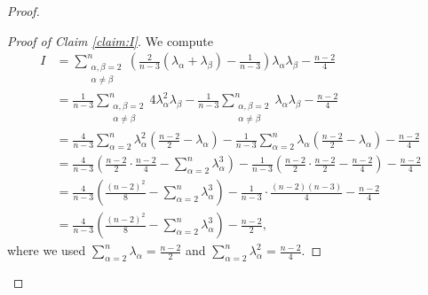 \documentclass[a4, 12pt]{amsart}
\theoremstyle{plain}
\begin{document}
\begin{proof}
	\begin{proof}[Proof of Claim \ref{claim:I}]
		We compute
	\begin{equation*}
	\begin{aligned}
			I &= \sum_{\substack{\alpha,\beta=2 \\ \alpha\neq\beta}}^n \left(\frac{2}{n-3}(\lambda_{\alpha} + \lambda_{\beta}) - \frac{1}{n-3}\right)\lambda_{\alpha}\lambda_{\beta} - \frac{n-2}{4} \\
			&= \frac{1}{n-3}\sum_{\substack{\alpha,\beta=2 \\ \alpha\neq\beta}}^n 4\lambda_\alpha^2 \lambda_\beta - \frac{1}{n-3}\sum_{\substack{\alpha,\beta=2 \\ \alpha\neq\beta}}^n \lambda_\alpha\lambda_\beta - \frac{n-2}{4} \\
			&= \frac{4}{n-3}\sum_{\alpha=2}^n \lambda_\alpha^2\left(\frac{n-2}{2} - \lambda_\alpha\right) - \frac{1}{n-3}\sum_{\alpha=2}^n\lambda_\alpha\left(\frac{n-2}{2} - \lambda_\alpha\right) - \frac{n-2}{4} \\
			&= \frac{4}{n-3}\left(\frac{n-2}{2} \cdot \frac{n-2}{4} - \sum_{\alpha=2}^n \lambda_\alpha^3\right) - \frac{1}{n-3}\left(\frac{n-2}{2} \cdot \frac{n-2}{2} - \frac{n-2}{4}\right) - \frac{n-2}{4} \\
			&= \frac{4}{n-3}\left(\frac{(n-2)^2}{8} - \sum_{\alpha=2}^n \lambda_\alpha^3\right) - \frac{1}{n-3} \cdot \frac{(n-2)(n-3)}{4} - \frac{n-2}{4} \\
			&= \frac{4}{n-3}\left(\frac{(n-2)^2}{8} - \sum_{\alpha=2}^n \lambda_\alpha^3\right) - \frac{n-2}{2},
		\end{aligned}
		\end{equation*}
		where we used $\sum_{\alpha=2}^n \lambda_\alpha = \frac{n-2}{2}$ and $\sum_{\alpha=2}^n \lambda_\alpha^2 = \frac{n-2}{4}$.
		

\end{proof}
\end{proof}
\end{document}

